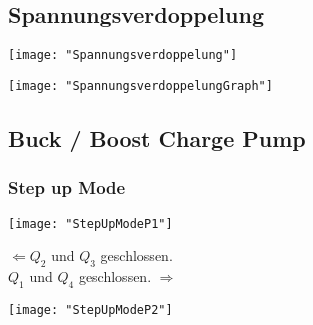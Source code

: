 
\subsection{Spannungsverdoppelung}
\begin{minipage}[t]{0.3\textwidth}
	\vspace{0pt}								%
	\texttt{[image: "Spannungsverdoppelung"]}
\end{minipage}\hspace{0.05\textwidth}
\begin{minipage}[t]{0.3\textwidth}
	\vspace{0pt}
	
\end{minipage}
\begin{minipage}[t]{0.3\textwidth}
	\vspace{0pt}
	\texttt{[image: "SpannungsverdoppelungGraph"]}
\end{minipage}
\vspace{2mm}


\subsection{Buck / Boost Charge Pump}
\subsubsection{Step up Mode}
\begin{minipage}[t]{0.3\textwidth}
	\vspace{0pt}								%
	\texttt{[image: "StepUpModeP1"]}
\end{minipage}\hspace{0.05\textwidth}
\begin{minipage}[t]{0.3\textwidth}
	\vspace{0pt}
	$\Leftarrow Q_2$ und $Q_3$ geschlossen.\\
	$Q_1$ und $Q_4$ geschlossen. $\Rightarrow$
\end{minipage}
\begin{minipage}[t]{0.3\textwidth}
	\vspace{0pt}
	\texttt{[image: "StepUpModeP2"]}
\end{minipage}
\vspace{2mm}

